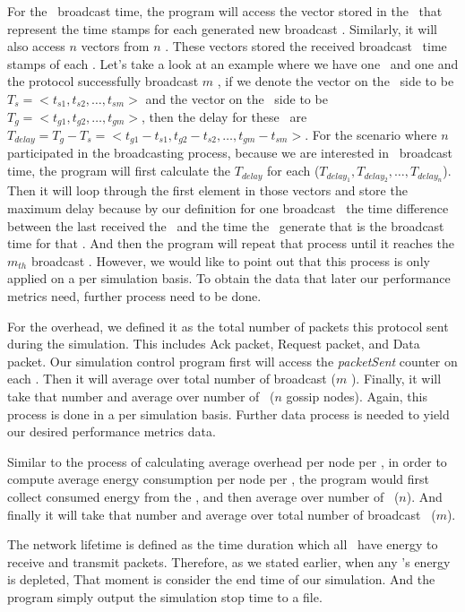 For the \msg ~broadcast time, the program will access the vector stored in the \sn ~that represent the time stamps for each generated new broadcast \msg. Similarly, it will also access $n$ vectors from $n$ \gns. These vectors stored the received broadcast \msg ~time stamps of each \gn. Let's take a look at an example where we have one \sn ~and one \gn and the protocol successfully broadcast $m$ \msgs, if we denote the vector on the \sn ~side to be $T_s=<t_{s1}, t_{s2}, \ldots, t_{sm}>$ and the vector on the \gn ~side to be $T_g=<t_{g1}, t_{g2}, \ldots, t_{gm}>$, then the delay for these \msgs ~are $T_{delay}= T_g - T_s = <t_{g1}-t_{s1}, t_{g2}-t_{s2}, \ldots, t_{gm}-t_{sm}>$. For the scenario where $n$ \gns participated in the broadcasting process, because we are interested in \msg ~broadcast time, the program will first calculate the $T_{delay}$ for each \gn ($T_{delay_1},T_{delay_2},\ldots,T_{delay_n} $). Then it will loop through the first element in those vectors and store the maximum delay because by our definition for one broadcast \msg ~the time difference between the last \gn received the \msg ~and the time the \sn ~generate that \msg is the broadcast time for that \msg. And then the program will repeat that process until it reaches the $m_{th}$ broadcast \msg. However, we would like to point out that this process is only applied on a per simulation basis. To obtain the data that later our performance metrics need, further process need to be done.

For the overhead, we defined it as the total number of packets this protocol sent during the simulation. This includes Ack packet, Request packet, and Data packet. Our simulation control program first will access the \emph{packetSent} counter on each \gn. Then it will average over total number of broadcast \msgs ($m$ \msgs). Finally, it will take that number and average over number of \gns ~($n$ gossip nodes). Again, this process is done in a per simulation basis. Further data process is needed to yield our desired performance metrics data.

Similar to the process of calculating average overhead per node per \msg, in order to compute average energy consumption per node per \msg, the program would first collect consumed energy from the \gns, and then average over number of \gns ~($n$). And finally it will take that number and average over total number of broadcast \msgs ~($m$). 

The network lifetime is defined as the time duration which all \gns ~have energy to receive and transmit packets. Therefore, as we stated earlier, when any \gn's energy is depleted, That moment is consider the end time of our simulation. And the program simply output the simulation stop time to a file.
